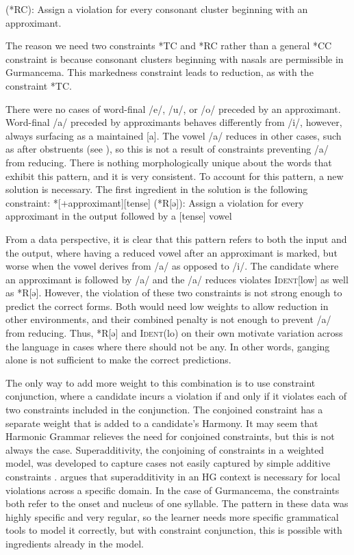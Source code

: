 \documentclass[output=paper,newtxmath,modfonts,nonflat,draftmode]{langsci/langscibook}
\begin{document}
\ea	*[+approximant][+consonantal] (*RC): Assign a violation for every consonant 
	cluster beginning with an approximant. 
\z

The reason we need two constraints *TC and *RC rather than a general *CC constraint is because consonant clusters beginning with nasals are permissible in Gurmancema. This markedness constraint leads to reduction, as with the constraint *TC. 


There were no cases of word-final /e/, /u/, or /o/ preceded by an approximant. Word-final /a/ preceded by approximants behaves differently from /i/, 
however, always surfacing as a maintained [a]. The vowel /a/ reduces in other cases, such as after obstruents (see ), so this is not a result of constraints preventing /a/ from reducing. There is nothing morphologically unique about the words that exhibit this pattern, and it is very consistent. To account for this pattern, a new solution is necessary. The first ingredient in the solution is the following constraint: 
\ea
*[+approximant][\textminus tense] (*R[ə]): Assign a violation for every approximant in 	the output followed by a [\textminus tense] vowel
\z

From a data perspective, it is clear that this pattern refers to both the input and the output, where having a reduced vowel after an approximant is marked, but worse when the vowel derives from /a/ as opposed to /i/. The candidate where an approximant is followed by /a/ and the /a/ reduces violates \textsc{Ident}[low] as well as *R[ə]. However, the violation of these two constraints is not strong enough to predict the correct forms. Both would need low weights to allow reduction in other environments, and their combined penalty is not enough to prevent /a/ from reducing. Thus, *R[ə] and \textsc{Ident}(lo) on their own motivate variation across the language in cases where there should not be any. In other words, ganging alone is not sufficient to make the correct predictions. 
	
The only way to add more weight to this combination is to use constraint conjunction, where a candidate incurs a violation if and only if it violates each of two constraints included in the conjunction. The conjoined constraint has a separate weight that is added to a candidate’s Harmony. It may seem that Harmonic Grammar relieves the need for conjoined constraints, but this is not always the case. Superadditivity, the conjoining of constraints in a weighted model, was developed to capture cases not easily captured by simple additive constraints \citep{AlbrightMagri2008,GreenDavis2014}. \citet{Smolensky2006} argues that superadditivity in an HG context is necessary for local violations across a specific domain. In the case of Gurmancema, the constraints both refer to the onset and nucleus of one syllable. The pattern in these data was highly specific and very regular, so the learner needs more specific grammatical tools to model it correctly, but with constraint conjunction, this is possible with ingredients already in the model. 
\end{document}
